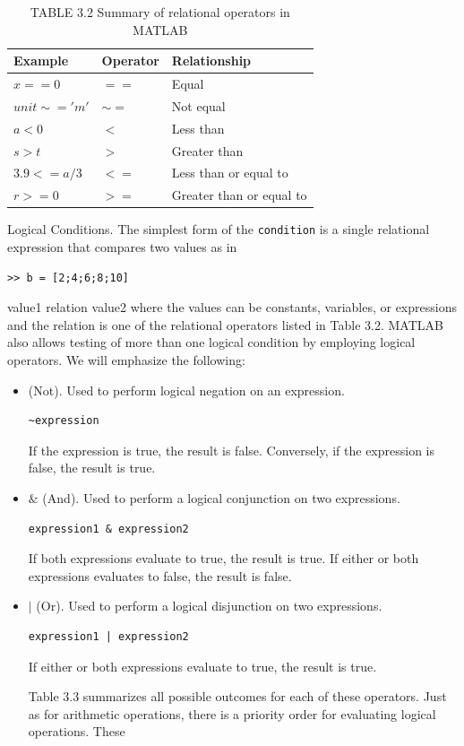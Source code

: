 \documentclass[../main.tex]{subfiles}
\begin{document}
\begin{table}[H]
    \caption*{TABLE 3.2 Summary of relational operators in MATLAB}
    \begin{tabular}{lll }
            \hline
            Example& Operator& Relationship\\
            \hline
            $x == 0  $  &  $==$& Equal\\
            $unit \sim= 'm'$ &$\sim =$ &Not equal\\
            $a < 0$ &$<$ &Less than\\
            $s > t$ &$>$& Greater than\\
            $3.9 <= a/3$ &$<=$ &Less than or equal to\\
            $r >= 0$ &$>=$& Greater than or equal to\\
            \hline
    \end{tabular}	
\end{table}

Logical Conditions. The simplest form of the \texttt{condition} is a single relational expression that compares two values as in
\begin{lstlisting}[frame=none, numbers=none]
    >> b = [2;4;6;8;10]
\end{lstlisting}
value1 relation value2
where the values can be constants, variables, or expressions and the relation is one of
the relational operators listed in Table 3.2.
MATLAB also allows testing of more than one logical condition by employing logical
operators. We will emphasize the following:
\begin{itemize}

 \item (Not). Used to perform logical negation on an expression.
\begin{lstlisting}[frame=none, numbers=none]
    ~expression
\end{lstlisting}

If the expression is true, the result is false. Conversely, if the expression is false,
the result is true.
\item $\&$ (And). Used to perform a logical conjunction on two expressions.
\begin{lstlisting}[frame=none, numbers=none]
    expression1 & expression2
\end{lstlisting}

If both expressions evaluate to true, the result is true. If either or both expressions evaluates to false, the result is false.
\item $ | $ (Or). Used to perform a logical disjunction on two expressions.
\begin{lstlisting}[frame=none, numbers=none]
    expression1 | expression2
\end{lstlisting}

If either or both expressions evaluate to true, the result is true.


Table 3.3 summarizes all possible outcomes for each of these operators. Just as for
arithmetic operations, there is a priority order for evaluating logical operations. These

 
\end{itemize}
\end{document}
